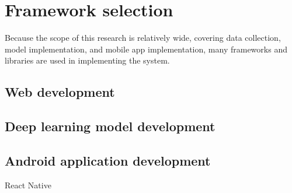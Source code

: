 \section{Framework selection}
\label{sec:Framework selection}
Because the scope of this research is relatively wide, covering data collection, model implementation, and mobile app implementation, many frameworks and libraries are used in implementing the system.

\subsection{Web development} %
\citet{nodejs2021}

\citet{react2021}

\citet{redux2021}

\subsection{Deep learning model development} %
\citet{abadi2015tensorflow}

\citet{steiner2019pytorch}

\citet{florencio2019performance}

\subsection{Android application development} %
\citet{singh2020mobile}

\citet{fadlilah2021development}

React Native \citet{eisenman2015learning}